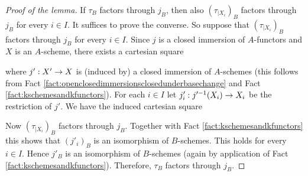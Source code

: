 \begin{proof}[Proof of the lemma]
If $\tau_B$ factors through $j_B$, then also $\left(\tau_{\mid X_i}\right)_B$ factors through $j_B$ for every $i\in I$. It suffices to prove the converse. So suppose that $\left(\tau_{\mid X_i}\right)_B$ factors through $j_B$ for every $i\in I$. Since $j$ is a closed immersion of $A$-functors and $X$ is an $A$-scheme, there exists a cartesian square
\begin{center}
\end{center}
where $j':X'\rightarrow X$ is (induced by) a closed immersion of $A$-schemes (this follows from Fact \ref{fact:openclosedimmersionsclosedunderbasechange}  and Fact \ref{fact:kschemesandkfunctors}). For each $i\in I$ let $j'_i:j'^{-1}(X_i)\rightarrow X_i$ be the restriction of $j'$. We have the induced cartesian square
\begin{center}
\end{center}
Now $\left(\tau_{\mid X_i}\right)_B$ factors through $j_B$. Together with Fact \ref{fact:kschemesandkfunctors} this shows that $\left(j'_i\right)_B$ is an isomorphism of $B$-schemes. This holds for every $i\in I$. Hence $j'_B$ is an isomorphism of $B$-schemes (again by application of Fact \ref{fact:kschemesandkfunctors}). Therefore, $\tau_B$ factors through $j_B$.
\end{proof}

